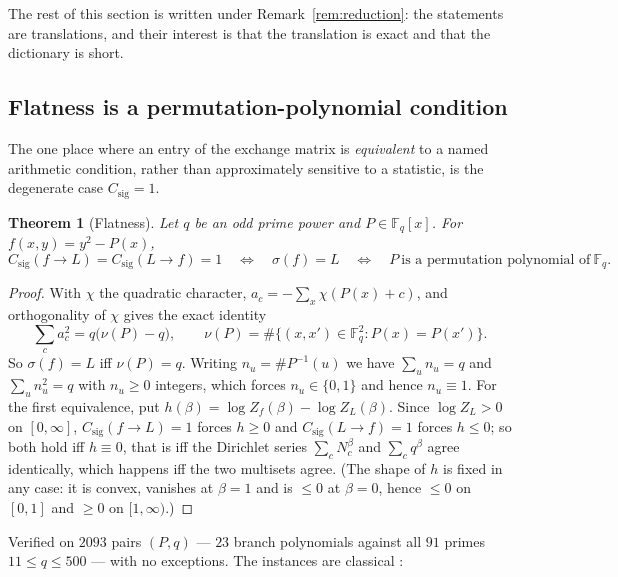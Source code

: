 \documentclass[11pt]{article}
\theoremstyle{definition}
\theoremstyle{plain}
\newtheorem{theorem}[definition]{Theorem}
\theoremstyle{remark}
\newcommand{\F}{\mathbb F}
\newcommand{\csig}{C_{\mathrm{sig}}}
\begin{document}
The rest of this section is written under Remark~\ref{rem:reduction}: the
statements are translations, and their interest is that the translation is
exact and that the dictionary is short.

\subsection{Flatness is a permutation-polynomial condition}

The one place where an entry of the exchange matrix is \emph{equivalent} to a
named arithmetic condition, rather than approximately sensitive to a statistic,
is the degenerate case \(\csig=1\).

\begin{theorem}[Flatness]
\label{thm:flatness}
Let \(q\) be an odd prime power and \(P\in\F_q[x]\).  For \(f(x,y)=y^2-P(x)\),
\[
  \csig(f\to L)=\csig(L\to f)=1
  \quad\Longleftrightarrow\quad
  \sigma(f)=L
  \quad\Longleftrightarrow\quad
  P\ \text{is a permutation polynomial of}\ \F_q .
\]
\end{theorem}

\begin{proof}
With \(\chi\) the quadratic character, \(a_c=-\sum_x\chi(P(x)+c)\), and
orthogonality of \(\chi\) gives the exact identity
\begin{equation}
  \sum_{c}a_c^2=q\bigl(\nu(P)-q\bigr),
  \qquad
  \nu(P)=\#\{(x,x')\in\F_q^2:P(x)=P(x')\}.
  \label{eq:nu-identity}
\end{equation}
So \(\sigma(f)=L\) iff \(\nu(P)=q\).  Writing \(n_u=\#P^{-1}(u)\) we have
\(\sum_un_u=q\) and \(\sum_un_u^2=q\) with \(n_u\ge0\) integers, which forces
\(n_u\in\{0,1\}\) and hence \(n_u\equiv1\).  For the first equivalence, put
\(h(\beta)=\log Z_f(\beta)-\log Z_L(\beta)\).  Since \(\log Z_L>0\) on
\([0,\infty]\), \(\csig(f\to L)=1\) forces \(h\ge0\) and \(\csig(L\to f)=1\)
forces \(h\le0\); so both hold iff \(h\equiv0\), that is iff the Dirichlet
series \(\sum_cN_c^\beta\) and \(\sum_cq^\beta\) agree identically, which
happens iff the two multisets agree.  (The shape of \(h\) is fixed in any case:
it is convex, vanishes at \(\beta=1\) and is \(\le0\) at \(\beta=0\), hence
\(\le0\) on \([0,1]\) and \(\ge0\) on \([1,\infty)\).)
\end{proof}

Verified on \(2093\) pairs \((P,q)\) --- \(23\) branch polynomials against all
\(91\) primes \(11\le q\le500\) --- with no exceptions.  The instances are
classical \cite{lidl-finite-fields}:
\end{document}
